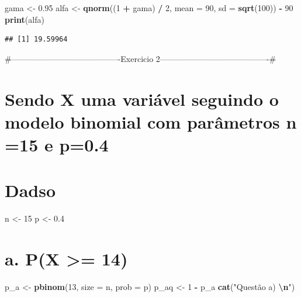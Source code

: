 \documentclass[
]{article}
\newenvironment{Shaded}{\begin{snugshade}}{\end{snugshade}}
\newcommand{\AttributeTok}[1]{\textcolor[rgb]{0.13,0.29,0.53}{#1}}
\newcommand{\DecValTok}[1]{\textcolor[rgb]{0.00,0.00,0.81}{#1}}
\newcommand{\FloatTok}[1]{\textcolor[rgb]{0.00,0.00,0.81}{#1}}
\newcommand{\FunctionTok}[1]{\textcolor[rgb]{0.13,0.29,0.53}{\textbf{#1}}}
\newcommand{\NormalTok}[1]{#1}
\newcommand{\OtherTok}[1]{\textcolor[rgb]{0.56,0.35,0.01}{#1}}
\newcommand{\SpecialCharTok}[1]{\textcolor[rgb]{0.81,0.36,0.00}{\textbf{#1}}}
\newcommand{\StringTok}[1]{\textcolor[rgb]{0.31,0.60,0.02}{#1}}
\begin{document}
\begin{Shaded}
\begin{Highlighting}[]
\NormalTok{gama }\OtherTok{\textless{}{-}} \FloatTok{0.95}
\NormalTok{alfa }\OtherTok{\textless{}{-}} \FunctionTok{qnorm}\NormalTok{((}\DecValTok{1} \SpecialCharTok{+}\NormalTok{ gama) }\SpecialCharTok{/} \DecValTok{2}\NormalTok{, }\AttributeTok{mean =} \DecValTok{90}\NormalTok{, }\AttributeTok{sd =} \FunctionTok{sqrt}\NormalTok{(}\DecValTok{100}\NormalTok{)) }\SpecialCharTok{{-}} \DecValTok{90}
\FunctionTok{print}\NormalTok{(alfa)}
\end{Highlighting}
\end{Shaded}

\begin{verbatim}
## [1] 19.59964
\end{verbatim}

\#----------------------------------------Exercicio
2----------------------------------------\#

\section{Sendo X uma variável seguindo o modelo binomial com parâmetros
n =15 e
p=0.4}\label{sendo-x-uma-variuxe1vel-seguindo-o-modelo-binomial-com-paruxe2metros-n-15-e-p0.4}

\section{Dadso}\label{dadso}

\begin{Shaded}
\begin{Highlighting}[]
\NormalTok{n }\OtherTok{\textless{}{-}} \DecValTok{15}
\NormalTok{p }\OtherTok{\textless{}{-}} \FloatTok{0.4}
\end{Highlighting}
\end{Shaded}

\section{a. P(X \textgreater= 14)}\label{a.-px-14}

\begin{Shaded}
\begin{Highlighting}[]
\NormalTok{p\_a }\OtherTok{\textless{}{-}} \FunctionTok{pbinom}\NormalTok{(}\DecValTok{13}\NormalTok{, }\AttributeTok{size =}\NormalTok{ n, }\AttributeTok{prob =}\NormalTok{ p)}
\NormalTok{p\_aq }\OtherTok{\textless{}{-}} \DecValTok{1} \SpecialCharTok{{-}}\NormalTok{ p\_a}
\FunctionTok{cat}\NormalTok{(}\StringTok{"Questão a) }\SpecialCharTok{\textbackslash{}n}\StringTok{"}\NormalTok{)}
\end{Highlighting}
\end{Shaded}
\end{document}
